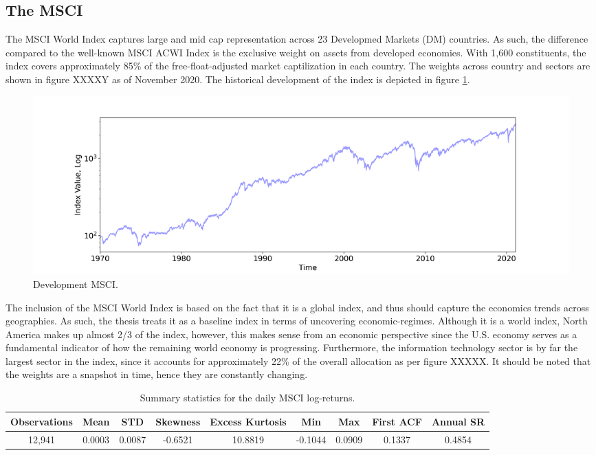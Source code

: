 \subsection{The MSCI}
\label{subsection: MSCI Index}
The MSCI World Index captures large and mid cap representation across 23 Developmed Markets (DM) countries. As such, the difference compared to the well-known MSCI ACWI Index is the exclusive weight on assets from developed economies. With 1,600 constituents, the index covers approximately 85\% of the free-float-adjusted market captilization in each country. The weights across country and sectors are shown in figure XXXXY as of November 2020. The historical development of the index is depicted in figure \ref{fig:MSCI_index}. 
 
\begin{figure}[H] 
    \centering
    \includegraphics[width=1.0\textwidth]{analysis/data_description/images/MSCI_index.png}
    \caption{Development MSCI.}
    \label{fig:MSCI_index}
\end{figure}


The inclusion of the MSCI World Index is based on the fact that it is a global index, and thus should capture the economics trends across geographies. As such, the thesis treats it as a baseline index in terms of uncovering economic-regimes. Although it is a world index, North America makes up almost 2/3 of the index, however, this makes sense from an economic perspective since the U.S. economy serves as a fundamental indicator of how the remaining world economy is progressing. Furthermore, the information technology sector is by far the largest sector in the index, since it accounts for approximately 22\% of the overall allocation as per figure XXXXX. It should be noted that the weights are a snapshot in time, hence they are constantly changing. 

\begin{table}[H]
\caption{Summary statistics for the daily MSCI log-returns.}
\centering
\begin{tabular}{c c c c c c c c c} 
\hline\hline
Observations & Mean & STD & Skewness & Excess Kurtosis & Min & Max & First ACF & Annual SR \\
\hline
12,941 & 0.0003 & 0.0087 & -0.6521 & 10.8819 & -0.1044 & 0.0909 & 0.1337 & 0.4854 \\
\hline
\end{tabular}
\label{tab:summary_stats_MSCI}
\end{table}

